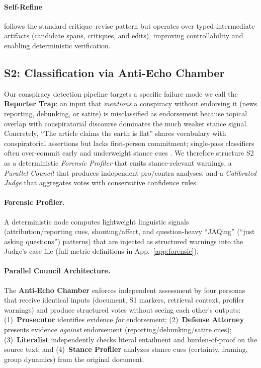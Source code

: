 \documentclass[11pt]{article}
\begin{document}
\paragraph{Self-Refine} follows the standard critique--revise pattern \cite{madaan2023selfrefine} but
operates over typed intermediate artifacts (candidate spans, critiques, and
edits), improving controllability and enabling deterministic verification.

\subsection{S2: Classification via Anti-Echo Chamber}

Our conspiracy detection pipeline targets a specific failure mode we call the \textbf{Reporter Trap}: an input that \emph{mentions} a conspiracy without endorsing it (news reporting, debunking, or satire) is misclassified as endorsement because topical overlap with conspiratorial discourse dominates the much weaker stance signal. Concretely, ``The article claims the earth is flat'' shares vocabulary with conspiratorial assertions but lacks first-person commitment; single-pass classifiers often over-commit early and underweight stance cues \cite{wan-etal-2025-unveiling}. We therefore structure S2 as a deterministic \emph{Forensic Profiler} that emits stance-relevant warnings, a \emph{Parallel Council} that produces independent pro/contra analyses, and a \emph{Calibrated Judge} that aggregates votes with conservative confidence rules.

\paragraph{Forensic Profiler.}
A deterministic node computes lightweight linguistic signals (attribution/reporting cues, shouting/affect, and question-heavy ``JAQing'' (``just asking questions'') patterns) that are injected as structured warnings into the Judge's case file (full metric definitions in App.~\ref{app:forensic}).


\paragraph{Parallel Council Architecture.} The \textbf{Anti-Echo Chamber} enforces independent assessment by four personas
that receive identical inputs (document, S1 markers, retrieval context,
profiler warnings) and produce structured votes without seeing each other's
outputs: (1)~\textbf{Prosecutor} identifies evidence \emph{for} endorsement;
(2)~\textbf{Defense Attorney} presents evidence \emph{against} endorsement
(reporting/debunking/satire cues); (3)~\textbf{Literalist} independently checks
literal entailment and burden-of-proof on the source text; and
(4)~\textbf{Stance Profiler} analyzes stance cues (certainty, framing, group
dynamics) from the original document.
\end{document}

